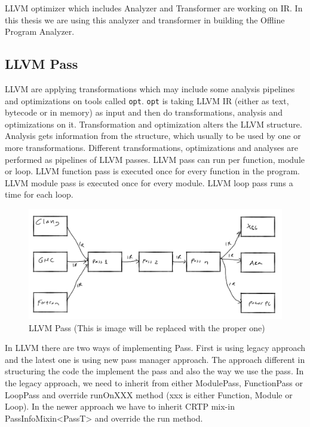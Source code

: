 LLVM optimizer \textemdash{} which includes Analyzer and Transformer \textemdash{} are working on IR. In this thesis we are using this analyzer and transformer in building the Offline Program Analyzer.

\subsection{LLVM Pass}

LLVM are applying transformations \textemdash{} which may include some analysis pipelines \textemdash{} and optimizations on tools called \texttt{opt}. \texttt{opt} is taking LLVM IR (either as text, bytecode or in memory) as input and then do transformations, analysis and optimizations on it. Transformation and optimization alters the LLVM structure. Analysis gets information from the structure, which usually to be used by one or more transformations. Different transformations, optimizations and analyses are performed as pipelines of LLVM passes. LLVM pass can run per function, module or loop. LLVM function pass is executed once for every function in the program. LLVM module pass is executed once for every module. LLVM loop pass runs a time for each loop.  

\begin{figure}[htbp] 
    \centerline{\includegraphics[scale=.25]{Figures/llvm.png}} 
    \caption{LLVM Pass (This is image will be replaced with the proper one)} 
    \label{fig:2-2} 
\end{figure} 

In LLVM there are two ways of implementing Pass. First is using legacy approach and the latest one is using new pass manager approach. The approach different in structuring the code the implement the pass and also the way we use the pass.  In the legacy approach, we need to inherit from either ModulePass, FunctionPass or LoopPass and override runOnXXX method (xxx is either Function, Module or Loop). In the newer approach we have to inherit CRTP mix-in PassInfoMixin<PassT> and override the run method.

